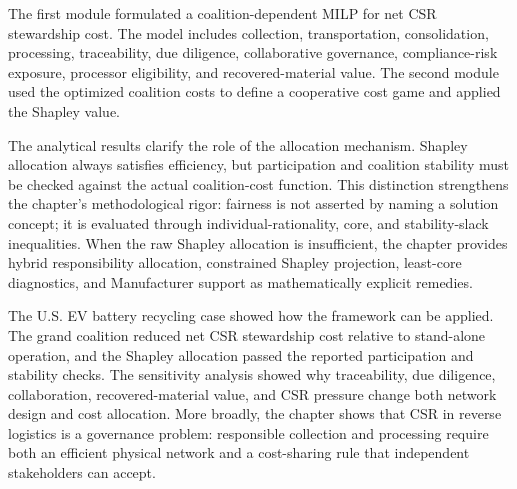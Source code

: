 The first module formulated a coalition-dependent MILP for net CSR stewardship cost. The model includes collection, transportation, consolidation, processing, traceability, due diligence, collaborative governance, compliance-risk exposure, processor eligibility, and recovered-material value. The second module used the optimized coalition costs to define a cooperative cost game and applied the Shapley value.

The analytical results clarify the role of the allocation mechanism. Shapley allocation always satisfies efficiency, but participation and coalition stability must be checked against the actual coalition-cost function. This distinction strengthens the chapter's methodological rigor: fairness is not asserted by naming a solution concept; it is evaluated through individual-rationality, core, and stability-slack inequalities. When the raw Shapley allocation is insufficient, the chapter provides hybrid responsibility allocation, constrained Shapley projection, least-core diagnostics, and Manufacturer support as mathematically explicit remedies.

The U.S. EV battery recycling case showed how the framework can be applied. The grand coalition reduced net CSR stewardship cost relative to stand-alone operation, and the Shapley allocation passed the reported participation and stability checks. The sensitivity analysis showed why traceability, due diligence, collaboration, recovered-material value, and CSR pressure change both network design and cost allocation. More broadly, the chapter shows that CSR in reverse logistics is a governance problem: responsible collection and processing require both an efficient physical network and a cost-sharing rule that independent stakeholders can accept.
